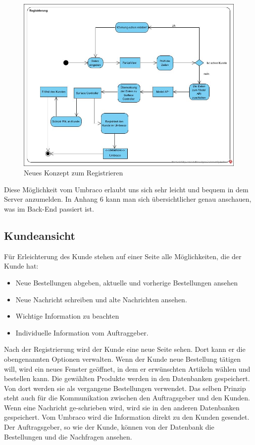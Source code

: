 \begin{figure}[h]
	\centering
	\includegraphics[width=\paperwidth,angle=90]{Graphics/Registrierung.JPG}
	\caption[neues Konzept: Registrierung]{Neues Konzept zum Registrieren}
	\label{fig: neues Konzept: Registrierung}
\end{figure}

Diese Möglichkeit vom Umbraco erlaubt uns sich sehr leicht und bequem in dem Server anzumelden.
In Anhang 6 kann man sich übersichtlicher genau anschauen, was im Back-End passiert ist.

\subsection{Kundeansicht}
Für Erleichterung des Kunde stehen auf einer Seite alle Möglichkeiten, die der Kunde hat: 

\begin{itemize}	
	\item Neue Bestellungen abgeben, aktuelle und vorherige Bestellungen ansehen
	\item Neue Nachricht schreiben und alte Nachrichten ansehen.
	\item Wichtige Information zu beachten
	\item Individuelle Information vom Auftraggeber.
\end{itemize}
Nach der Registrierung wird der Kunde eine neue Seite sehen. Dort kann er die obengenannten Optionen verwalten. 
Wenn der Kunde neue Bestellung tätigen will, wird ein neues Fenster geöffnet, in dem er erwünschten Artikeln wählen und bestellen kann. Die gewählten Produkte werden in den Datenbanken gespeichert. Von dort werden sie als vergangene Bestellungen verwendet. Das selben Prinzip steht auch für die Kommunikation zwischen den Auftragsgeber und den Kunden. Wenn eine Nachricht ge-schrieben wird, wird sie in den anderen Datenbanken gespeichert. 
Vom Umbraco wird die Information direkt zu den Kunden gesendet. 
Der Auftragsgeber, so wie der Kunde, können von der Datenbank die Bestellungen und die Nachfragen ansehen.


